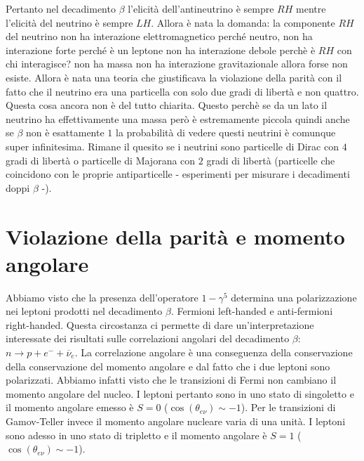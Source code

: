 Pertanto nel decadimento $\beta$ l'elicità dell'antineutrino è sempre $RH$ mentre l'elicità del neutrino è sempre $LH$. Allora è nata la domanda: la componente $RH$ del neutrino non ha interazione elettromagnetico perché neutro, non ha interazione forte perché è un leptone non ha interazione debole perchè è $RH$ con chi interagisce? non ha massa non ha interazione gravitazionale allora forse non esiste. Allora è nata una teoria che giustificava la violazione della parità con il fatto che il neutrino era una particella con solo due gradi di libertà e non quattro. Questa cosa ancora non è del tutto chiarita. Questo perchè se da un lato il neutrino ha effettivamente una massa però è estremamente piccola quindi anche se $\beta$ non è esattamente $1$ la probabilità di vedere questi neutrini è comunque super infinitesima. Rimane il quesito se i neutrini sono particelle di Dirac con $4$ gradi di libertà o particelle di Majorana con $2$ gradi di libertà (particelle che coincidono con le proprie antiparticelle - esperimenti per misurare i decadimenti doppi $\beta$ -).
\section{Violazione della parità e momento angolare}
Abbiamo visto che la presenza dell'operatore $1-\gamma^5$ determina una polarizzazione nei leptoni prodotti nel decadimento $\beta$. Fermioni left-handed e anti-fermioni right-handed. Questa circostanza ci permette di dare un'interpretazione interessate dei risultati sulle correlazioni angolari del decadimento $\beta$: $n\to p+e^-+\overline{\nu}_e$. La correlazione angolare è una conseguenza della conservazione della conservazione del momento angolare e dal fatto che i due leptoni sono polarizzati. Abbiamo infatti visto che le transizioni di Fermi non cambiano il momento angolare del nucleo. I leptoni pertanto sono in uno stato di singoletto e il momento angolare emesso è $S=0$ ($\cos(\theta_{e\nu})\sim -1$). Per le transizioni di Gamov-Teller invece il momento angolare nucleare varia di una unità. I leptoni sono adesso in uno stato di tripletto e il momento angolare è $S=1$ ($\cos(\theta_{e\nu})\sim -1$).
